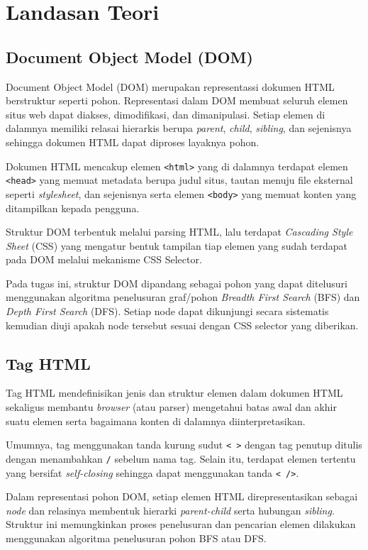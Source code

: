 \chapter{Landasan Teori}

\section{Document Object Model (DOM)}

Document Object Model (DOM) merupakan representassi dokumen HTML berstruktur seperti pohon. Representasi dalam DOM membuat seluruh elemen situs web dapat diakses, dimodifikasi, dan dimanipulasi. Setiap elemen di dalamnya memiliki relasai hierarkis berupa \textit{parent}, \textit{child}, \textit{sibling}, dan sejenisnya sehingga dokumen HTML dapat diproses layaknya pohon.

Dokumen HTML mencakup elemen \texttt{<html>} yang di dalamnya terdapat elemen \texttt{<head>} yang memuat metadata berupa judul situs, tautan menuju file eksternal seperti \textit{stylesheet}, dan sejenisnya serta elemen \texttt{<body>} yang memuat konten yang ditampilkan kepada pengguna.

Struktur DOM terbentuk melalui parsing HTML, lalu terdapat \textit{Cascading Style Sheet} (CSS) yang mengatur bentuk tampilan tiap elemen yang sudah terdapat pada DOM melalui mekanisme CSS Selector.

Pada tugas ini, struktur DOM dipandang sebagai pohon yang dapat ditelusuri menggunakan algoritma penelusuran graf/pohon \textit{Breadth First Search} (BFS) dan \textit{Depth First Search} (DFS). Setiap node dapat dikunjungi secara sistematis kemudian diuji apakah node tersebut sesuai dengan CSS selector yang diberikan.

\section{Tag HTML}

Tag HTML mendefinisikan jenis dan struktur elemen dalam dokumen HTML sekaligus membantu \textit{browser} (atau parser) mengetahui batas awal dan akhir suatu elemen serta bagaimana konten di dalamnya diinterpretasikan.

Umumnya, tag menggunakan tanda kurung sudut \texttt{< >} dengan tag penutup ditulis dengan menambahkan \texttt{/} sebelum nama tag. Selain itu, terdapat elemen tertentu yang bersifat \textit{self-closing} sehingga dapat menggunakan tanda \texttt{< />}.

Dalam representasi pohon DOM, setiap elemen HTML direpresentasikan sebagai \textit{node} dan relasinya membentuk hierarki \textit{parent-child} serta hubungan \textit{sibling}. 
Struktur ini memungkinkan proses penelusuran dan pencarian elemen dilakukan menggunakan algoritma penelusuran pohon BFS atau DFS.

